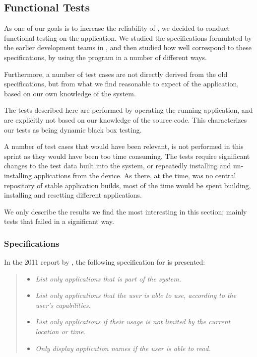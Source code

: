 \subsection{Functional Tests}\label{sec:sprint1:testing}

As one of our goals is to increase the reliability of \launcher, we decided to conduct functional testing on the application.
We studied the specifications formulated by the earlier development teams in \citet{launcher2011,launcher2012}, and then studied how well \launcher correspond to these specifications, by using the program in a number of different ways. 

Furthermore, a number of test cases are not directly derived from the old specifications, but from what we find reasonable to expect of the application, based on our own knowledge of the system.

The tests described here are performed by operating the running application, and are explicitly not based on our knowledge of the source code. 
This characterizes our tests as being dynamic black box testing. 

A number of test cases that would have been relevant, is not performed in this sprint as they would have been too time consuming. 
The tests require significant changes to the test data built into the \giraf system, or repeatedly installing and un-installing applications from the device.
As there, at the time, was no central repository of stable application builds, most of the time would be spent building, installing and resetting different applications.

We only describe the results we find the most interesting in this section; mainly tests that failed in a significant way.

\subsubsection*{Specifications}
In the 2011 report by \citet{launcher2011}, the following specification for \launcher is presented:

\begin{quote}
\begin{itemize}
	\item \textit{List only applications that is part of the \giraf system.}
	\item \textit{List only applications that the user is able to use, according to the user's capabilities.}
	\item \textit{List only applications if their usage is not limited by the current location or time.}
	\item \textit{Only display application names if the user is able to read.}
\end{itemize}
\end{quote}

